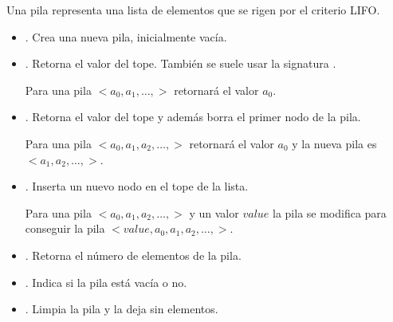 


\begin{definition}[Pila]{}\label{def:Pila}

Una pila representa una lista de elementos que se rigen por el criterio LIFO.

\begin{itemize}
\item {}. Crea una nueva pila, inicialmente vacía.

\item {}. Retorna el valor del tope. También se suele usar la signatura .

Para una pila  $<a_0, a_1, \ldots,>$ retornará el valor $a_0$.

\item {}. Retorna el valor del tope y además borra el primer nodo de la pila.

Para una pila  $<a_0, a_1, a_2, \ldots,>$ retornará el valor $a_0$ y la nueva pila es  $<a_1, a_2, \ldots,>$.


\item {}. Inserta un nuevo nodo en el tope de la lista. 

Para una pila  $<a_0, a_1, a_2, \ldots,>$ y un valor $value$ la pila se modifica para conseguir la pila $<value, a_0, a_1, a_2, \ldots,>$.


\item {}. Retorna el número de elementos de la pila.

\item {}. Indica si la pila está vacía o no.

\item {}. Limpia la pila y la deja sin elementos.

\end{itemize}
\end{definition}


